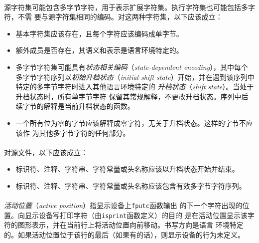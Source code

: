 \paragraph{}
源字符集可能包含多字节字符，用于表示扩展字符集。执行字符集也可能包括多字符，不需
要与源字符集相同的编码。对这两种字符集，以下应该成立：
\begin{itemize}
  \item{基本字符集应该存在，且每个字符应该编码成单字节。}
  \item{额外成员是否存在，其语义和表示是语言环境特定的。}
  \item{多字节字符集可能具有\textit{状态相关编码}（\textit{state-dependent
    encoding}），其中每个多字节字符序列以\textit{初始升档状态}（\textit{initial
    shift state}）开始，并在遇到该序列中特定的多字节字符时进入其他语言环境特定的
    \textit{升档状态}（\textit{shift state}）。当处于升档状态时，所有单字节字符
    保留其常规解释，不更改升档状态。序列中后续字节的解释是当前升档状态的函数。}
  \item{一个所有位为零的字节应该解释成零字符，无关于升档状态。这样的字节不应该作
    为其他多字节字符的任何部分。}
\end{itemize}

\paragraph{}
对源文件，以下应该成立：
\begin{itemize}
  \item{标识符、注释、字符串、字符常量或头名称应该以升档状态开始并结束。}
  \item{标识符、注释、字符串、字符常量或头名称应该包含有效多字节字符序列。}
\end{itemize}

\paragraph{}
\textit{活动位置}（\textit{active position}）指显示设备上\texttt{fputc}函数输出
的下一个字符出现的位置。向显示设备写打印字符（由\texttt{isprint}函数定义）的目的
是在活动位置显示该字符的图形表示，并在当前行上将活动位置向前移动。书写方向是语言
环境特定的。如果活动位置位于该行的最后（如果有的话），则显示设备的行为未定义。

